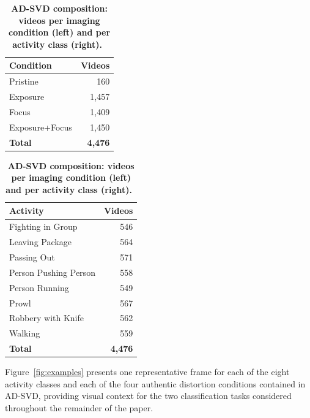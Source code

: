 \documentclass[runningheads]{llncs}
\begin{document}
\begin{table}[htbp]
\centering
\caption{\textbf{AD-SVD composition: videos per imaging condition
(left) and per activity class (right).}~\cite{9698081,akyk-7b78-20}}
\label{tab:dataset}
\fontsize{8}{9.6}\selectfont
\begin{tabular}{lr}
\toprule
\textbf{Condition} & \textbf{Videos} \\
\midrule
Pristine        & 160 \\
Exposure        & 1,457 \\
Focus           & 1,409 \\
Exposure+Focus  & 1,450 \\
\midrule
\textbf{Total} & \textbf{4,476} \\
\bottomrule
\end{tabular}
\qquad
\begin{tabular}{lr}
\toprule
\textbf{Activity} & \textbf{Videos} \\
\midrule
Fighting in Group     & 546 \\
Leaving Package       & 564 \\
Passing Out           & 571 \\
Person Pushing Person & 558 \\
Person Running        & 549 \\
Prowl                 & 567 \\
Robbery with Knife    & 562 \\
Walking               & 559 \\
\midrule
\textbf{Total} & \textbf{4,476} \\
\bottomrule
\end{tabular}
\end{table}

Figure~\ref{fig:examples} presents one representative frame for
each of the eight activity classes and each of the four authentic
distortion conditions contained in AD-SVD, providing visual context for
the two classification tasks considered throughout the remainder of the
paper.
\end{document}

